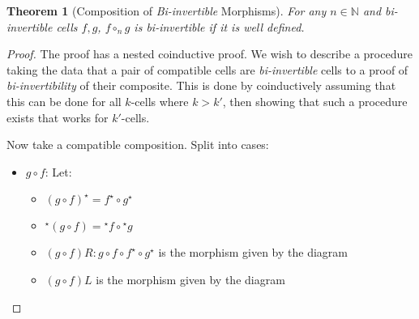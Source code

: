 \documentclass{article}
\newtheorem{theorem}{Theorem}
\theoremstyle{definition}
\theoremstyle{examplestyle}
\newcommand{\linv}[1]{{}^\star\!#1}
\newcommand{\rinv}[1]{#1^\star}
\begin{document}
\begin{theorem}[Composition of \emph{Bi-invertible} Morphisms]
  For any \(n \in \mathbb{N}\) and \emph{bi-invertible} cells \(f,g\), \(f \circ_n g\) is \emph{bi-invertible} if it is well defined.
\end{theorem}
\begin{proof}
  The proof has a nested coinductive proof. We wish to describe a procedure taking the data that a pair of compatible cells are \emph{bi-invertible} cells to a proof of \emph{bi-invertibility} of their composite. This is done by coinductively assuming that this can be done for all \(k\)-cells where \(k>k'\), then showing that such a procedure exists that works for \(k'\)-cells.

  Now take a compatible composition. Split into cases:
  \begin{itemize}
  \item \(g \circ f\): Let:
    \begin{itemize}
      \item \(\rinv {(g \circ f)} = \rinv f \circ \rinv g\)
      \item \(\linv {(g \circ f)} = \linv f \circ \linv g\)
      \item \((g \circ f)R : g \circ f \circ \rinv f \circ \rinv g\) is the morphism given by the diagram
        \begin{center}
        \end{center}
      \item \((g \circ f)L\) is the morphism given by the diagram
        \begin{center}
          \begin{tikzpicture}

\end{tikzpicture}
\end{center}
\end{itemize}
\end{itemize}
\end{proof}
\end{document}
